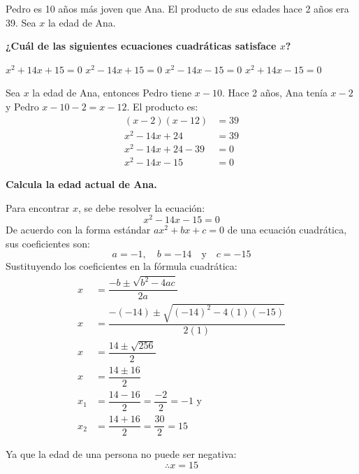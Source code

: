 Pedro es 10 años más joven que Ana. El producto de sus edades hace 2 años era 39. Sea $x$ la edad de Ana.
\begin{subparts}
    \subpart  \textbf{¿Cuál de las siguientes ecuaciones cuadráticas satisface $x$?}

    \begin{oneparchoices}
        \choice $x^2+14x+15=0$
        \choice $x^2-14x+15=0$
        \CorrectChoice $x^2-14x-15=0$
        \choice $x^2+14x-15=0$
    \end{oneparchoices}

    \begin{solutionbox}{4.5cm}
        Sea $x$ la edad de Ana, entonces Pedro tiene $x-10$. Hace 2 años, Ana tenía $x-2$ y Pedro $x-10-2=x-12$. El producto es:
        \begin{align*}
            (x-2)(x-12)   & =39  \\
            x^2-14x+24    & = 39 \\
            x^2-14x+24-39 & = 0  \\
            x^2-14x-15    & = 0
        \end{align*}
    \end{solutionbox}

    \subpart \textbf{Calcula la edad actual de Ana.}

    \begin{solutionbox}{14.2cm}
        Para encontrar $x$, se debe resolver la ecuación:
        \[ x^2-14x-15  =0 \]
        De acuerdo con la forma estándar $ax^2 + bx + c = 0$ de una ecuación cuadrática, sus coeficientes son:
        \[a=-1, \quad b=-14 \quad \text{y} \quad c=-15\]
        Sustituyendo los coeficientes en la fórmula cuadrática:
        \begin{align*}
            x   & = \dfrac{-b\pm\sqrt{b^2-4ac}}{2a}                 \\[1.2em]
            x   & = \dfrac{-(-14)\pm\sqrt{(-14)^2-4(1)(-15)}}{2(1)} \\[1.2em]
            x   & = \dfrac{14\pm\sqrt{256}}{2}                      \\[1.2em]
            x   & = \dfrac{14\pm 16}{2}                             \\[1.2em]
            x_1 & = \dfrac{14-16}{2}=\dfrac{-2}{2}=-1 \text{ y }    \\[1.2em]
            x_2 & = \dfrac{14+16}{2}=\dfrac{30}{2}=15
        \end{align*}

        Ya que la edad de una persona no puede ser negativa:
        \[\therefore x=15\]
    \end{solutionbox}
\end{subparts}